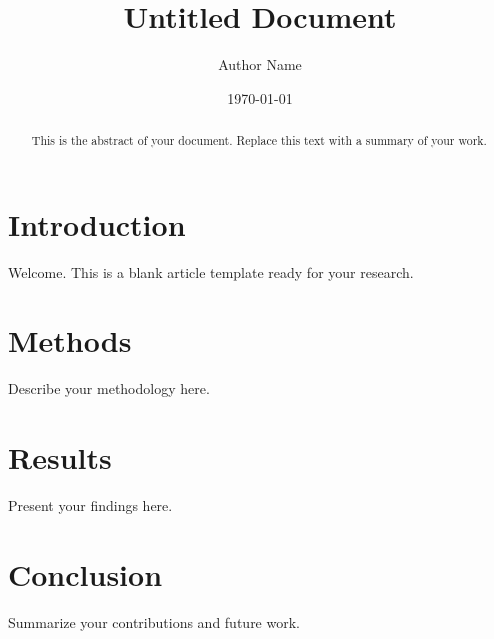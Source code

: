 \documentclass[11pt,a4paper]{article}
\title{Untitled Document}
\author{Author Name}
\date{\today}
\begin{document}
\maketitle

\begin{abstract}
This is the abstract of your document. Replace this text with a summary of your work.
\end{abstract}

\section{Introduction}

Welcome. This is a blank article template ready for your research.

\section{Methods}

Describe your methodology here.

\section{Results}

Present your findings here.

\section{Conclusion}

Summarize your contributions and future work.
\end{document}
